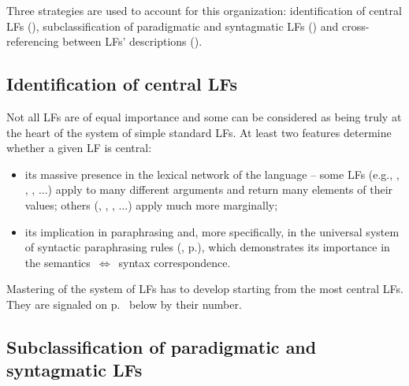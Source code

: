Three strategies are used to account for this organization: identification of central LFs (), subclassification of paradigmatic and syntagmatic LFs () and cross-referencing between LFs' descriptions ().

\subsection{Identification of central LFs}\label{sec:centralLFs}

Not all LFs are of equal importance and some can be considered as being truly at the heart of the system of simple standard LFs. At least two features determine whether a given LF is central:

\begin{itemize}

\item its massive presence in the lexical network of the language -- some LFs (e.g., , , , ...) apply to many different arguments and return many elements of their values; others (, , , ...) apply much more marginally;

\item its implication in paraphrasing and, more specifically, in the universal system of syntactic paraphrasing rules (, p.\thinspace\pageref{sec:LFStandardParaphrasing}), which demonstrates its importance in the semantics~$\Leftrightarrow$~syntax correspondence.

\end{itemize}

Mastering of the system of LFs has to develop starting from the most central LFs. They are signaled on p.~\pageref{tab:systFL} below by their  number.

\subsection{Subclassification of paradigmatic and syntagmatic LFs}\label{sec:subclassificationParaSyntLFs}

